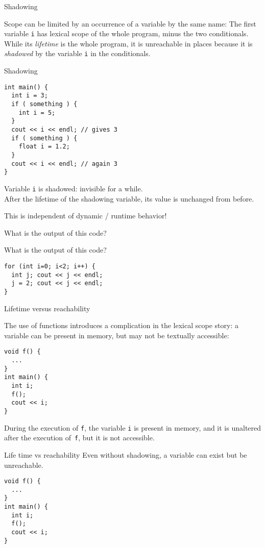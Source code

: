  {Shadowing}

Scope can be limited by an occurrence of a variable by the same name:
%
%
The first variable \lstinline{i} has lexical scope of the whole program, minus
the two conditionals. While its
\emph{lifetime} is the whole program, it is
unreachable in places because it is
\emph{shadowed} by the variable \lstinline{i} in the conditionals.

\begin{slide}{Shadowing}
  \label{sl:scope-shadow}
\begin{lstlisting}
int main() {
  int i = 3;
  if ( something ) {
    int i = 5;
  }
  cout << i << endl; // gives 3
  if ( something ) {
    float i = 1.2;
  }
  cout << i << endl; // again 3
}
\end{lstlisting}
Variable \lstinline{i} is shadowed: invisible for a while.\\
After the lifetime of the shadowing variable, its value is unchanged
from before.
\end{slide}

This is independent of dynamic / runtime behavior!

\begin{exercise}
  \label{ex:shadowfalse}
  What is the output of this code?
\end{exercise}

\begin{exercise}
  \label{ex:loopinitvar}
  What is the output of this code?
\begin{lstlisting}
for (int i=0; i<2; i++) {
  int j; cout << j << endl;
  j = 2; cout << j << endl;
}
\end{lstlisting}
\end{exercise}

 {Lifetime versus reachability}

The use of functions introduces a complication in the lexical scope story:
a variable can be present in memory, but may not be textually accessible:
\begin{lstlisting}
void f() {
  ...
}
int main() {
  int i;
  f();
  cout << i;
}
\end{lstlisting}
During the execution of \lstinline{f}, the variable \lstinline{i} is present in
memory, and it is unaltered after the execution of~\lstinline{f},
but it is not accessible.

\begin{slide}{Life time vs reachability}
  \label{sl:scope-lifetime}
  Even without shadowing, a variable can exist but be unreachable.
\begin{lstlisting}
void f() {
  ...
}
int main() {
  int i;
  f();
  cout << i;
}
\end{lstlisting}
\end{slide}

